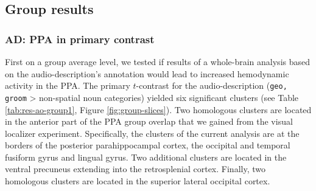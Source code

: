 \documentclass[english]{article}
\begin{document}



\subsection{Group results}

\subsubsection{AD: PPA in primary contrast}

First on a group average level, we tested if results of a whole-brain analysis
based on the audio-description's annotation would lead to increased hemodynamic
activity in the PPA.
The primary $t$-contrast for the audio-description (\texttt{geo, groom} >
non-spatial noun categories) yielded six significant clusters (see Table
\ref{tab:res-ao-group1}, Figure \ref{fig:group-slices}).
Two homologous clusters are located in the anterior part of the PPA group
overlap that we gained from the visual localizer experiment.
Specifically, the clusters of the current analysis are at the borders of the
posterior parahippocampal cortex, the occipital and temporal fusiform gyrus and
lingual gyrus.
Two additional clusters are located in the ventral precuneus extending into the
retrosplenial cortex.
Finally, two homologous clusters are located in the superior lateral occipital
cortex.
\end{document}
